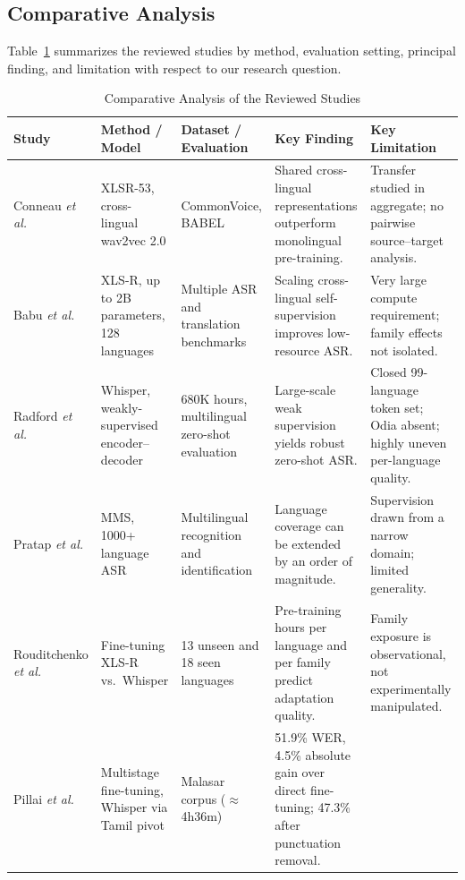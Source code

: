 \documentclass[conference]{IEEEtran}
\begin{document}
\subsection{Comparative Analysis}

Table~\ref{tab:comparison} summarizes the reviewed studies by method,
evaluation setting, principal finding, and limitation with respect to
our research question.

\begin{table}[!t]
\caption{Comparative Analysis of the Reviewed Studies}
\label{tab:comparison}
\centering
\renewcommand{\arraystretch}{1.2}
\scriptsize
\begin{tabular}{|p{2.4cm}|p{3.1cm}|p{3.0cm}|p{3.6cm}|p{3.6cm}|}
\hline
\textbf{Study} & \textbf{Method / Model} & \textbf{Dataset / Evaluation} &
\textbf{Key Finding} & \textbf{Key Limitation} \\
\hline
Conneau \emph{et al.} \cite{conneau2021xlsr} &
XLSR-53, cross-lingual wav2vec 2.0 &
CommonVoice, BABEL &
Shared cross-lingual representations outperform monolingual pre-training. &
Transfer studied in aggregate; no pairwise source--target analysis. \\
\hline
Babu \emph{et al.} \cite{babu2022xlsr} &
XLS-R, up to 2B parameters, 128 languages &
Multiple ASR and translation benchmarks &
Scaling cross-lingual self-supervision improves low-resource ASR. &
Very large compute requirement; family effects not isolated. \\
\hline
Radford \emph{et al.} \cite{radford2023whisper} &
Whisper, weakly-supervised encoder--decoder &
680K hours, multilingual zero-shot evaluation &
Large-scale weak supervision yields robust zero-shot ASR. &
Closed 99-language token set; Odia absent; highly uneven per-language quality. \\
\hline
Pratap \emph{et al.} \cite{pratap2024mms} &
MMS, 1000+ language ASR &
Multilingual recognition and identification &
Language coverage can be extended by an order of magnitude. &
Supervision drawn from a narrow domain; limited generality. \\
\hline
Rouditchenko \emph{et al.} \cite{rouditchenko2023unseen} &
Fine-tuning XLS-R vs.\ Whisper &
13 unseen and 18 seen languages &
Pre-training hours per language and per family predict adaptation quality. &
Family exposure is observational, not experimentally manipulated. \\
\hline
Pillai \emph{et al.} \cite{pillai2024multistage} &
Multistage fine-tuning, Whisper via Tamil pivot &
Malasar corpus ($\approx$4h36m) &
51.9\% WER, 4.5\% absolute gain over direct fine-tuning; 47.3\% after punctuation removal. &

\end{tabular}
\end{table}
\end{document}
